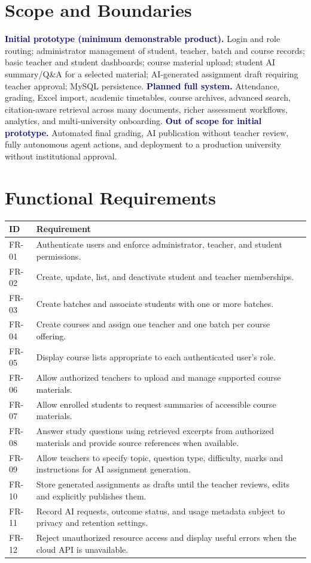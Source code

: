 \documentclass[11pt,a4paper]{article}
\newcommand{\heading}[1]{\vspace{5pt}\textcolor{navy}{\textbf{#1}}}
\begin{document}
\section{Scope and Boundaries}
\heading{Initial prototype (minimum demonstrable product).} Login and role routing; administrator management of student, teacher, batch and course records; basic teacher and student dashboards; course material upload; student AI summary/Q\&A for a selected material; AI-generated assignment draft requiring teacher approval; MySQL persistence.
\heading{Planned full system.} Attendance, grading, Excel import, academic timetables, course archives, advanced search, citation-aware retrieval across many documents, richer assessment workflows, analytics, and multi-university onboarding.
\heading{Out of scope for initial prototype.} Automated final grading, AI publication without teacher review, fully autonomous agent actions, and deployment to a production university without institutional approval.
\section{Functional Requirements}
\begin{longtable}{p{}p{}}\toprule ID&Requirement\\\midrule\endhead
FR-01&Authenticate users and enforce administrator, teacher, and student permissions.\\
FR-02&Create, update, list, and deactivate student and teacher memberships.\\
FR-03&Create batches and associate students with one or more batches.\\
FR-04&Create courses and assign one teacher and one batch per course offering.\\
FR-05&Display course lists appropriate to each authenticated user's role.\\
FR-06&Allow authorized teachers to upload and manage supported course materials.\\
FR-07&Allow enrolled students to request summaries of accessible course materials.\\
FR-08&Answer study questions using retrieved excerpts from authorized materials and provide source references when available.\\
FR-09&Allow teachers to specify topic, question type, difficulty, marks and instructions for AI assignment generation.\\
FR-10&Store generated assignments as drafts until the teacher reviews, edits and explicitly publishes them.\\
FR-11&Record AI requests, outcome status, and usage metadata subject to privacy and retention settings.\\
FR-12&Reject unauthorized resource access and display useful errors when the cloud API is unavailable.\\\bottomrule
\end{longtable}
\end{document}
